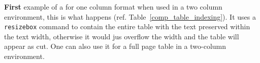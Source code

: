 \documentclass{sig-alternate-05-2015}
\begin{document}
\textbf{First} example of a for one column format when used in a two column environment, this is what happens (ref. Table~\ref{comp_table_indexing}). It uses a \texttt{resizebox} command to contain the entire table with the text preserved within the text width, otherwise it would jus overflow the width and the table will appear as cut. One can also use it for a full page table in a two-column environment.

\begin{table}
\centering
{}
\caption{A table comparing the indexing platforms and data structures used by a variety of question answering systems.}
\label{comp_table_indexing}
\end{table}
\end{document}
